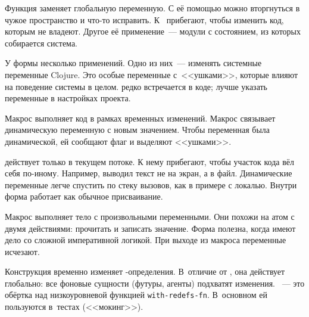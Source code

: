 Функция  заменяет глобальную переменную. С её помощью можно
вторгнуться в чужое пространство и что-то исправить. К~
прибегают, чтобы изменить код, которым не владеют. Другое её применение~---
модули с состоянием, из которых собирается система.

У формы  несколько применений. Одно из них~--- изменять системные
переменные Clojure. Это особые переменные с~<<ушками>>, которые влияют на
поведение системы в целом.  редко встречается в коде; лучше указать
переменные в настройках проекта.

Макрос  выполняет код в рамках временных изменений. Макрос
связывает динамическую переменную с новым значением. Чтобы переменная была
динамической, ей сообщают флаг  и выделяют <<ушками>>.

 действует только в текущем потоке. К нему прибегают, чтобы
участок кода вёл себя по-иному. Например, выводил текст не на экран, а в
файл. Динамические переменные легче спустить по стеку вызовов, как в примере с
локалью. Внутри  форма  работает как обычное
присваивание.

Макрос  выполняет тело с произвольными переменными. Они
похожи на атом с двумя действиями: прочитать и записать значение. Форма полезна,
когда имеют дело со сложной императивной логикой. При выходе из макроса
переменные исчезают.

Конструкция  временно изменяет
-оп\-ре\-де\-ле\-ния. В~отличие от , она действует глобально:
все фоновые сущности (футуры, агенты) подхватят
изменения. ~--- это обёртка над низкоуровневой функцией
\texttt{with-redefs-fn}. В~основном ей пользуются в~тестах (<<мокинг>>).


